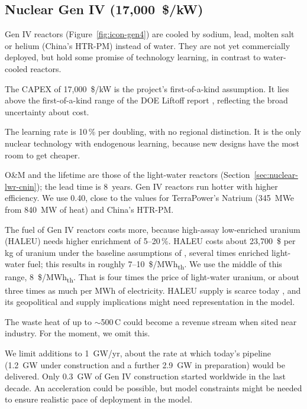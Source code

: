 \subsection{Nuclear Gen IV (17,000~\$/kW)}\label{sec:nuclear-gen4}
Gen IV reactors (Figure~\ref{fig:icon-gen4}) are cooled by sodium, lead, molten salt or helium (China's HTR-PM) instead of water.
They are not yet commercially deployed, but hold some promise of technology learning, in contrast to water-cooled reactors.


The CAPEX of 17,000~\$/kW is the project's first-of-a-kind assumption.
It lies above the first-of-a-kind range of the DOE Liftoff report \citep{doe2024nuclear}, reflecting the broad uncertainty about cost.

The learning rate is 10\,\% per doubling, with no regional distinction.
It is the only nuclear technology with endogenous learning, because new designs have the most room to get cheaper.

O\&M and the lifetime are those of the light-water reactors (Section~\ref{sec:nuclear-lwr-cnin}); the lead time is 8~years.
Gen IV reactors run hotter with higher efficiency.
We use 0.40, close to the values for TerraPower's Natrium (345~MWe from 840~MW of heat) and China's HTR-PM.

The fuel of Gen IV reactors costs more, because high-assay low-enriched uranium (HALEU) needs higher enrichment of 5--20\,\%.
HALEU costs about 23,700~\$ per kg of uranium under the baseline assumptions of \citet{nia2023}, several times enriched light-water fuel;
this results in roughly 7--10~\$/MWh\textsubscript{th}.
We use the middle of this range, 8~\$/MWh\textsubscript{th}.
That is four times the price of light-water uranium, or about three times as much per MWh of electricity.
HALEU supply is scarce today \citep{doe2024nuclear}, and its geopolitical and supply implications might need representation in the model.

The waste heat of up to $\sim$500\,\textdegree C could become a revenue stream when sited near industry.
For the moment, we omit this.

We limit additions to 1~GW/yr, about the rate at which today's pipeline (1.2~GW under construction and a further 2.9~GW in preparation) would be delivered.
Only 0.3~GW of Gen IV construction started worldwide in the last decade.
An acceleration could be possible, but model constraints might be needed to ensure realistic pace of deployment in the model.
